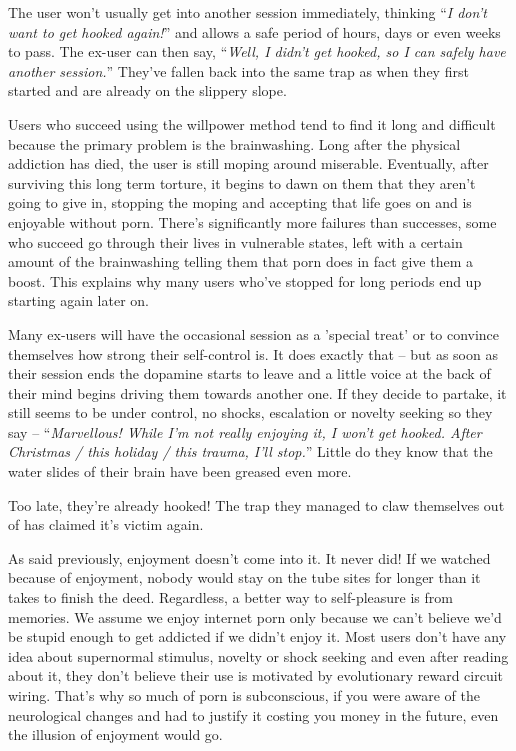 \documentclass[
]{book}
\begin{document}
The user won't usually get into another session immediately, thinking ``\emph{I don't want to get hooked again!}'' and allows a safe period of hours, days or even weeks to pass. The ex-user can then say, ``\emph{Well, I didn't get hooked, so I can safely have another session.}'' They've fallen back into the same trap as when they first started and are already on the slippery slope.

Users who succeed using the willpower method tend to find it long and difficult because the primary problem is the brainwashing. Long after the physical addiction has died, the user is still moping around miserable. Eventually, after surviving this long term torture, it begins to dawn on them that they aren't going to give in, stopping the moping and accepting that life goes on and is enjoyable without porn. There's significantly more failures than successes, some who succeed go through their lives in vulnerable states, left with a certain amount of the brainwashing telling them that porn does in fact give them a boost. This explains why many users who've stopped for long periods end up starting again later on.

Many ex-users will have the occasional session as a 'special treat' or to convince themselves how strong their self-control is. It does exactly that -- but as soon as their session ends the dopamine starts to leave and a little voice at the back of their mind begins driving them towards another one. If they decide to partake, it still seems to be under control, no shocks, escalation or novelty seeking so they say -- ``\emph{Marvellous! While I'm not really enjoying it, I won't get hooked. After Christmas / this holiday / this trauma, I'll stop.}'' Little do they know that the water slides of their brain have been greased even more.

Too late, they're already hooked! The trap they managed to claw themselves out of has claimed it's victim again.

As said previously, enjoyment doesn't come into it. It never did! If we watched because of enjoyment, nobody would stay on the tube sites for longer than it takes to finish the deed. Regardless, a better way to self-pleasure is from memories. We assume we enjoy internet porn only because we can't believe we'd be stupid enough to get addicted if we didn't enjoy it. Most users don't have any idea about supernormal stimulus, novelty or shock seeking and even after reading about it, they don't believe their use is motivated by evolutionary reward circuit wiring. That's why so much of porn is subconscious, if you were aware of the neurological changes and had to justify it costing you money in the future, even the illusion of enjoyment would go.
\end{document}
